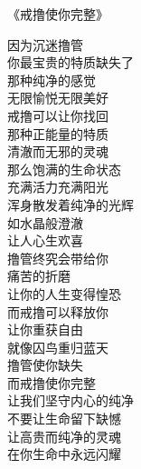 \begin{center}
    《戒撸使你完整》\it
    \begin{multicols}{2}
        因为沉迷撸管 \\ 你最宝贵的特质缺失了 \\ 那种纯净的感觉 \\ 无限愉悦无限美好 \\ 戒撸可以让你找回 \\ 那种正能量的特质 \\ 清澈而无邪的灵魂 \\ 那么饱满的生命状态 \\ 充满活力充满阳光 \\ 浑身散发着纯净的光辉 \\ 如水晶般澄澈 \\ 让人心生欢喜 \\ 撸管终究会带给你 \\ 痛苦的折磨 \\ 让你的人生变得惶恐 \\ 而戒撸可以释放你 \\ 让你重获自由 \\ 就像囚鸟重归蓝天 \\ 撸管使你缺失 \\ 而戒撸使你完整 \\ 让我们坚守内心的纯净 \\ 不要让生命留下缺憾 \\ 让高贵而纯净的灵魂 \\ 在你生命中永远闪耀
    \end{multicols}
\end{center}

